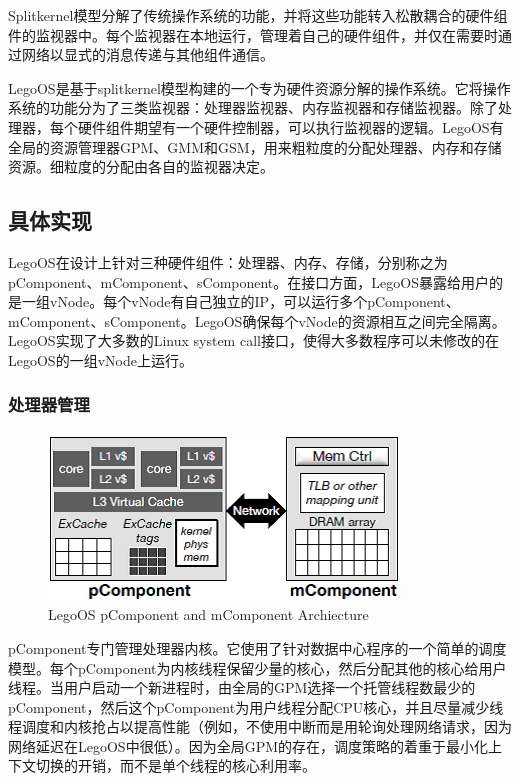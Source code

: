 Splitkernel模型分解了传统操作系统的功能，并将这些功能转入松散耦合的硬件组件的监视器中。每个监视器在本地运行，管理着自己的硬件组件，并仅在需要时通过网络以显式的消息传递与其他组件通信。

LegoOS是基于splitkernel模型构建的一个专为硬件资源分解的操作系统。它将操作系统的功能分为了三类监视器：处理器监视器、内存监视器和存储监视器。除了处理器，每个硬件组件期望有一个硬件控制器，可以执行监视器的逻辑。LegoOS有全局的资源管理器GPM、GMM和GSM，用来粗粒度的分配处理器、内存和存储资源。细粒度的分配由各自的监视器决定。

\subsection{具体实现}

LegoOS在设计上针对三种硬件组件：处理器、内存、存储，分别称之为pComponent、mComponent、sComponent。在接口方面，LegoOS暴露给用户的是一组vNode。每个vNode有自己独立的IP，可以运行多个pComponent、mComponent、sComponent。LegoOS确保每个vNode的资源相互之间完全隔离。LegoOS实现了大多数的Linux system call接口，使得大多数程序可以未修改的在LegoOS的一组vNode上运行。

\subsubsection{处理器管理}

\begin{figure}[h]
\centering
\includegraphics[scale=1.00]{Figures/legoos/1.png}
\decoRule
\caption{LegoOS pComponent and mComponent Archiecture}
\label{fig:legoos_archiecture}
\end{figure}

pComponent专门管理处理器内核。它使用了针对数据中心程序的一个简单的调度模型。每个pComponent为内核线程保留少量的核心，然后分配其他的核心给用户线程。当用户启动一个新进程时，由全局的GPM选择一个托管线程数最少的pComponent，然后这个pComponent为用户线程分配CPU核心，并且尽量减少线程调度和内核抢占以提高性能（例如，不使用中断而是用轮询处理网络请求，因为网络延迟在LegoOS中很低）。因为全局GPM的存在，调度策略的着重于最小化上下文切换的开销，而不是单个线程的核心利用率。

